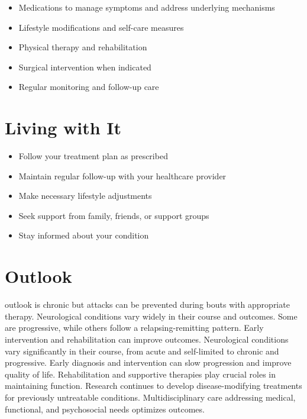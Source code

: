 \begin{itemize}[noitemsep]
  \item Medications to manage symptoms and address underlying mechanisms
  \item Lifestyle modifications and self-care measures
  \item Physical therapy and rehabilitation
  \item Surgical intervention when indicated
  \item Regular monitoring and follow-up care
\end{itemize}
\section{Living with It}
\begin{itemize}[noitemsep]
  \item Follow your treatment plan as prescribed
  \item Maintain regular follow-up with your healthcare provider
  \item Make necessary lifestyle adjustments
  \item Seek support from family, friends, or support groups
  \item Stay informed about your condition
\end{itemize}
\section{Outlook}
outlook is chronic but attacks can be prevented during bouts with appropriate therapy. Neurological conditions vary widely in their course and outcomes. Some are progressive, while others follow a relapsing-remitting pattern. Early intervention and rehabilitation can improve outcomes. Neurological conditions vary significantly in their course, from acute and self-limited to chronic and progressive. Early diagnosis and intervention can slow progression and improve quality of life. Rehabilitation and supportive therapies play crucial roles in maintaining function. Research continues to develop disease-modifying treatments for previously untreatable conditions. Multidisciplinary care addressing medical, functional, and psychosocial needs optimizes outcomes.

